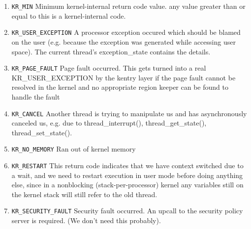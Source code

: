 \begin{enumerate}

\item {\tt KR_MIN} Minimum kernel-internal return code value. any
value greater than or equal to this is a kernel-internal code.

\item {\tt KR_USER_EXCEPTION} A processor exception occured which
should be blamed on the user (e.g. because the exception was generated
while accessing user space). The current thread's exception_state
contains the details.

\item {\tt KR_PAGE_FAULT} Page fault occurred.
This gets turned into a real KR_USER_EXCEPTION by the kentry layer
if the page fault cannot be resolved in the kernel
and no appropriate region keeper can be found to handle the fault

\item {\tt KR_CANCEL} Another thread is trying to manipulate us and
has asynchronously canceled us,  e.g. due to thread_interrupt(),
thread_get_state(), thread_set_state().

\item {\tt KR_NO_MEMORY} Ran out of kernel memory

\item {\tt KR_RESTART} This return code indicates that we have context
switched due to a wait, and we need to restart execution in user mode
before doing anything else, since in a nonblocking
(stack-per-processor) kernel any variables still on the kernel stack
will still refer to the old thread.

\item {\tt KR_SECURITY_FAULT} Security fault occurred.
An upcall to the security policy server is required. (We don't need
this probably).

\end{enumerate}


